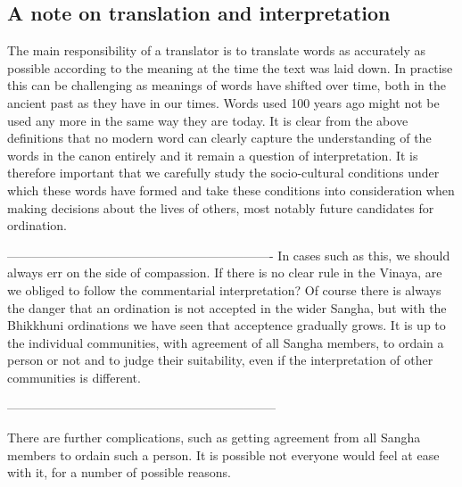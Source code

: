 \subsection{A note on translation and interpretation}
The main responsibility of a translator is to translate words as accurately as possible according to the meaning at the time the text was laid down. In practise this can be challenging as meanings of words have shifted over time, both in the ancient past as they have in our times. Words used 100 years ago might not be used any more in the same way they are today. It is clear from the above definitions that no modern word can clearly capture the understanding of the words in the canon entirely and it remain a question of interpretation. It is therefore important that we carefully study the socio-cultural conditions under which these words have formed and take these conditions into consideration when making decisions about the lives of others, most notably future candidates for ordination.


----------------------------------------------------------------
In cases such as this, we should always err on the side of compassion. If there is no clear rule in the Vinaya, are we obliged to follow the commentarial interpretation? Of course there is always the danger that an ordination is not accepted in the wider Sangha, but with the Bhikkhuni ordinations we have seen that acceptence gradually grows. It is up to the individual communities, with agreement of all Sangha members, to ordain a person or not and to judge their suitability, even if the interpretation of other communities is different. 



-----------------------------------------------------------------




There are further complications, such as getting agreement from all Sangha members to ordain such a person. It is possible not everyone would feel at ease with it, for a number of possible reasons.
